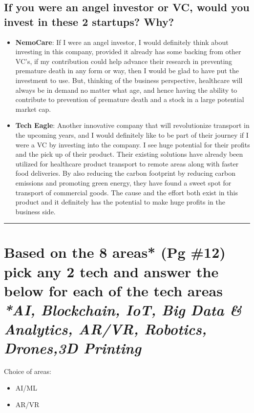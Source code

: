 \documentclass[a4paper]{article}
\begin{document}
\subsection{If you were an angel investor or VC, would you invest in these 2 startups? Why?}

\large{
\begin{itemize}
    \item \textbf{NemoCare}: If I were an angel investor, I would definitely think about investing in this company, provided it already has some backing from other VC's, if my contribution could help advance their research in preventing premature death in any form or way, then I would be glad to have put the investment to use. But, thinking of the business perspective, healthcare will always be in demand no matter what age, and hence having the ability to contribute to prevention of premature death and a stock in a large potential market cap.
    \item \textbf{Tech Eagle}: Another innovative company that will revolutionize transport in the upcoming years, and I would definitely like to be part of their journey if I were a VC by investing into the company. I see huge potential for their profits and the pick up of their product. Their existing solutions have already been utilized for healthcare product transport to remote areas along with faster food deliveries. By also reducing the carbon footprint by reducing carbon emissions and promoting green energy, they have found a sweet spot for transport of commercial goods. The cause and the effort both exist in this product and it definitely has the potential to make huge profits in the business side.
\end{itemize}
}

\rule{\textwidth}{0.4pt}

\newpage

\section{Based on the 8 areas* (Pg \#12) pick any 2 tech and answer the below for each of the tech areas
\\\textit{*AI, Blockchain, IoT, Big Data \& Analytics, AR/VR, Robotics, Drones,3D Printing}}

\large{Choice of areas:
\begin{itemize}
    \item AI/ML
    \item AR/VR
\end{itemize}
}
\end{document}
